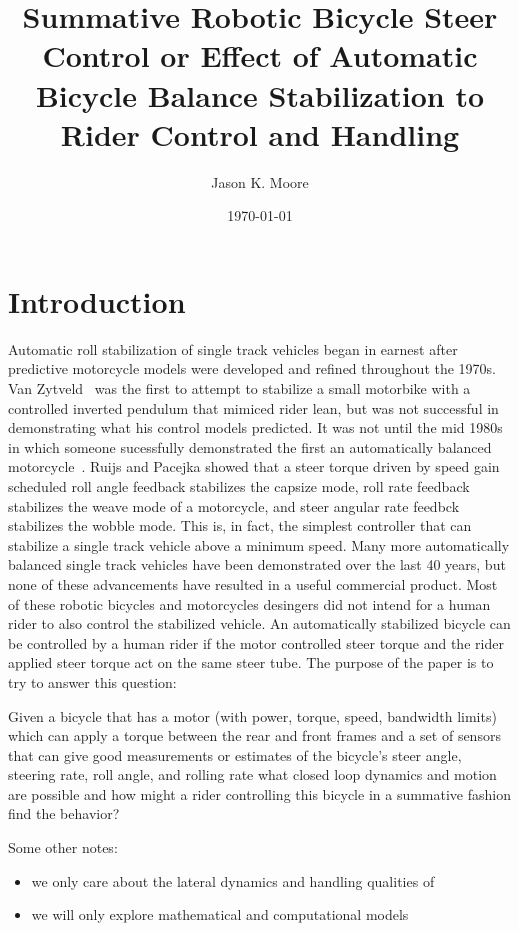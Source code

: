 \documentclass[12pt]{article}
\title{Summative Robotic Bicycle Steer Control or
Effect of Automatic Bicycle Balance Stabilization to Rider Control and
Handling}
\author{Jason K. Moore}
\date{\today}
\begin{document}
\maketitle

\section{Introduction}

Automatic roll stabilization of single track vehicles began in earnest after
predictive motorcycle models were developed and refined throughout the 1970s.
Van Zytveld~\cite{Zytveld1975} was the first to attempt to stabilize a small
motorbike with a controlled inverted pendulum that mimiced rider lean, but was
not successful in demonstrating what his control models predicted. It was not
until the mid 1980s in which someone sucessfully demonstrated the first an
automatically balanced motorcycle~\cite{Ruijs1986a}. Ruijs and Pacejka showed
that a steer torque driven by speed gain scheduled roll angle feedback
stabilizes the capsize mode, roll rate feedback stabilizes the weave mode of a
motorcycle, and steer angular rate feedbck stabilizes the wobble mode. This is,
in fact, the simplest controller that can stabilize a single track vehicle
above a minimum speed.  Many more automatically balanced single track vehicles
have been demonstrated over the last 40 years, but none of these advancements
have resulted in a useful commercial product. Most of these robotic bicycles
and motorcycles desingers did not intend for a human rider to also control the
stabilized vehicle. An automatically stabilized bicycle can be controlled by a
human rider if the motor controlled steer torque and the rider applied steer
torque act on the same steer tube. The purpose of the paper is to try to answer
this question:

Given a bicycle that has a motor (with power, torque, speed, bandwidth limits)
which can apply a torque between the rear and front frames and a set of sensors
that can give good measurements or estimates of the bicycle's steer angle,
steering rate, roll angle, and rolling rate what closed loop dynamics and
motion are possible and how might a rider controlling this bicycle in a
summative fashion find the behavior?

Some other notes:

\begin{itemize}
  \item we only care about the lateral dynamics and handling qualities of
  \item we will only explore mathematical and computational models
\end{itemize}
\end{document}
